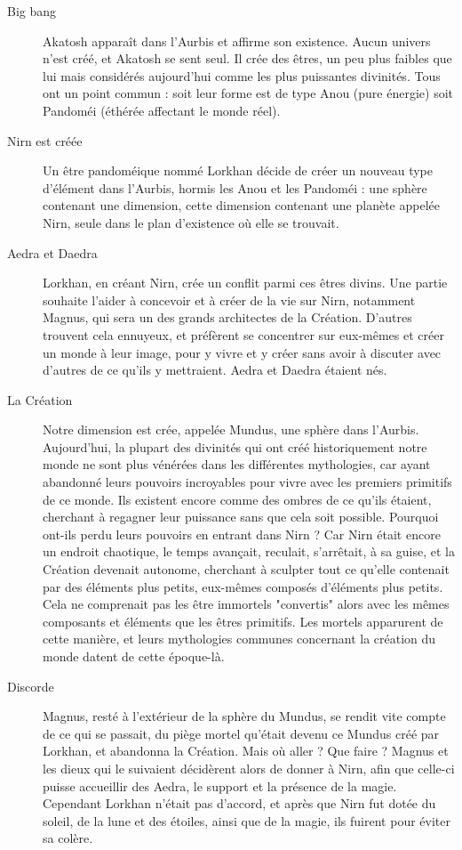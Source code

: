 \begin{description}
\item[Big bang]
Akatosh apparaît dans l'Aurbis et affirme son existence. Aucun univers n'est créé, et Akatosh se sent seul. Il crée des êtres, un peu plus faibles que lui mais considérés aujourd'hui comme les plus puissantes divinités. Tous ont un point commun : soit leur forme est de type Anou (pure énergie) soit Pandoméi (éthérée affectant le monde réel).
\item[Nirn est créée]
Un être pandoméique nommé Lorkhan décide de créer un nouveau type d'élément dans l'Aurbis, hormis les Anou et les Pandoméi : une sphère contenant une dimension, cette dimension contenant une planète appelée Nirn, seule dans le plan d'existence où elle se trouvait.
\item[Aedra et Daedra]
Lorkhan, en créant Nirn, crée un conflit parmi ces êtres divins. Une partie souhaite l'aider à concevoir et à créer de la vie sur Nirn, notamment Magnus, qui sera un des grands architectes de la Création. D'autres trouvent cela ennuyeux, et préfèrent se concentrer sur eux-mêmes et créer un monde à leur image, pour y vivre et y créer sans avoir à discuter avec d'autres de ce qu'ils y mettraient. Aedra et Daedra étaient nés.
\item[La Création]
Notre dimension est crée, appelée Mundus, une sphère dans l'Aurbis. Aujourd'hui, la plupart des divinités qui ont créé historiquement notre monde ne sont plus vénérées dans les différentes mythologies, car ayant abandonné leurs pouvoirs incroyables pour vivre avec les premiers primitifs de ce monde. Ils existent encore comme des ombres de ce qu'ils étaient, cherchant à regagner leur puissance sans que cela soit possible. Pourquoi ont-ils perdu leurs pouvoirs en entrant dans Nirn ? Car Nirn était encore un endroit chaotique, le temps avançait, reculait, s'arrêtait, à sa guise, et la Création devenait autonome, cherchant à sculpter tout ce qu'elle contenait par des éléments plus petits, eux-mêmes composés d'éléments plus petits. Cela ne comprenait pas les être immortels "convertis" alors avec les mêmes composants et éléments que les êtres primitifs. Les mortels apparurent de cette manière, et leurs mythologies communes concernant la création du monde datent de cette époque-là.
\item[Discorde]
Magnus, resté à l'extérieur de la sphère du Mundus, se rendit vite compte de ce qui se passait, du piège mortel qu'était devenu ce Mundus créé par Lorkhan, et abandonna la Création. Mais où aller ? Que faire ? Magnus et les dieux qui le suivaient décidèrent alors de donner à Nirn, afin que celle-ci puisse accueillir des Aedra, le support et la présence de la magie. Cependant Lorkhan n'était pas d'accord, et après que Nirn fut dotée du soleil, de la lune et des étoiles, ainsi que de la magie, ils fuirent pour éviter sa colère.

\end{description}
